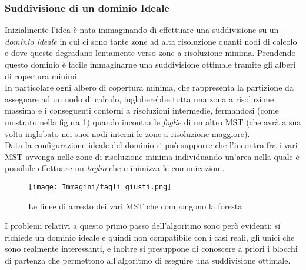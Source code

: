 \subsubsection{Suddivisione di un dominio Ideale}
Inizialmente l'idea è nata immaginando di effettuare una suddivisione su un \emph{dominio ideale} in cui ci sono tante zone ad alta risoluzione quanti nodi di calcolo e dove queste degradano lentamente verso zone a risoluzione minima. Prendendo questo dominio è facile immaginarne una suddivisione ottimale tramite gli alberi di copertura minimi.\\
In particolare ogni albero di copertura minima, che rappresenta la partizione da assegnare ad un nodo di calcolo, ingloberebbe tutta una zona a risoluzione massima e i conseguenti contorni a risoluzioni intermedie, fermandosi (come mostrato nella figura \ref{fig:mst_stop}) quando incontra le \emph{foglie} di un altro MST (che avrà a sua volta inglobato nei suoi nodi interni le zone a risoluzione maggiore).\\
Data la configurazione ideale del dominio si può supporre che l'incontro fra i vari MST avvenga nelle zone di risoluzione minima individuando un'area nella quale è possibile  effettuare un \textit{taglio} che minimizza le comunicazioni.
\begin{figure}[H]
	\centering
	\texttt{[image: Immagini/tagli\_giusti.png]}
	\caption{Le linee di arresto dei vari MST che compongono la foresta}
		\label{fig:mst_stop}

\end{figure}
I problemi relativi a questo primo passo dell'algoritmo sono però evidenti: si richiede un dominio ideale e quindi non compatibile con i casi reali, gli unici che sono realmente interessanti, e inoltre si presuppone di conoscere a priori i blocchi di partenza che permettono all'algoritmo di eseguire una suddivisione ottimale.\\

